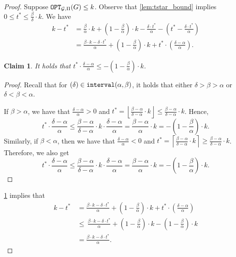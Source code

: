 \documentclass[letterpaper,11pt]{article}
\newenvironment{claimproof}{\begin{proof}\renewcommand{\qedsymbol}{$\lrcorner$}}{\end{proof}}
\newcommand{\1}[1]{\mathds{1}\left[#1\right]}
\newcommand{\OPT}{\textnormal{\texttt{OPT}}}
\newcommand{\goodd}{\textnormal{\texttt{interval}}(\alpha, \beta)}
\newtheorem{claim}[theorem]{Claim}
\newcommand{\cG}{\mathcal{G}}
\begin{document}
\begin{proof}
	Suppose $\OPT_{\cG,\Pi}(G) \leq k$.
	Observe that \cref{lem:tstar_bound} implies $0 \leq t^* \leq \frac{\beta}{\delta} \cdot  k$.
	We have
	\begin{align}
		k - t^* &= \frac{\beta}{\alpha}\cdot k + \left( 1 - \frac{\beta}{\alpha} \right) \cdot k -\frac{\delta \cdot t^*}{\alpha} - \left( t^* - \frac{\delta \cdot t^*}{\alpha} \right)\nonumber\\
				     &= \frac{\beta \cdot k - \delta\cdot t^*}{\alpha} + \left( 1 - \frac{\beta}{\alpha} \right) \cdot k + t^* \cdot \left(\frac{ \delta - \alpha }{\alpha}\right)\label{eq:kminustdelta}.
	\end{align}

	\begin{claim}\label{claim:simple_ineq}
		It holds that $t^* \cdot \frac{\delta - \alpha}{\alpha}  \leq -\left( 1 - \frac{\beta}{\alpha} \right)\cdot k$.
	\end{claim}

	\begin{claimproof}
		Recall that for $(\delta) \in \goodd$, it holds that either $\delta > \beta > \alpha$ or $\delta < \beta < \alpha$.
		
		If $\beta > \alpha$, we have that $\frac{\delta - \alpha}{\alpha} > 0$ and $t^* = \left\lfloor \frac{\beta - \alpha}{\delta  -\alpha}  \cdot k \right\rfloor \leq  \frac{\beta - \alpha}{\delta  -\alpha}  \cdot k$. Hence,
		\begin{equation*}
			t^* \cdot \frac{\delta - \alpha}{\alpha} \leq \frac{\beta - \alpha}{\delta  -\alpha}  \cdot k \cdot \frac{\delta - \alpha}{\alpha} = \frac{\beta - \alpha}{\alpha} \cdot k = -\left( 1 - \frac{\beta}{\alpha} \right)\cdot k .
		\end{equation*}
		Similarly, if $\beta < \alpha$, then we have that $\frac{\delta - \alpha}{\alpha} < 0$ and $t^* = \left\lceil  \frac{\beta - \alpha}{\delta  -\alpha}  \cdot k  \right\rceil \geq  \frac{\beta - \alpha}{\delta  -\alpha}  \cdot k$. Therefore, we also get
		\begin{equation*}
			t^* \cdot \frac{\delta - \alpha}{\alpha} \leq \frac{\beta - \alpha}{\delta  -\alpha}  \cdot k \cdot \frac{\delta - \alpha}{\alpha} = \frac{\beta - \alpha}{\alpha} \cdot k = -\left( 1 - \frac{\beta}{\alpha} \right)\cdot k.
		\end{equation*}
	\end{claimproof}

	\cref{claim:simple_ineq} implies that
\begin{align*}
	k - t^* \,&= \frac{\beta \cdot k - \delta\cdot t^*}{\alpha} + \left( 1 - \frac{\beta}{\alpha} \right) \cdot k + t^* \cdot \left(\frac{ \delta - \alpha }{\alpha}\right)\label{eq:kminustdelta}\\
	&\leq \,\frac{\beta \cdot k - \delta \cdot t^*}{\alpha} + \left( 1 - \frac{\beta}{\alpha} \right) \cdot k - \left( 1 - \frac{\beta}{\alpha} \right) \cdot k\\	
	&= \frac{\beta \cdot k - \delta \cdot t^*}{\alpha}.	
\end{align*}


\end{proof}
\end{document}
